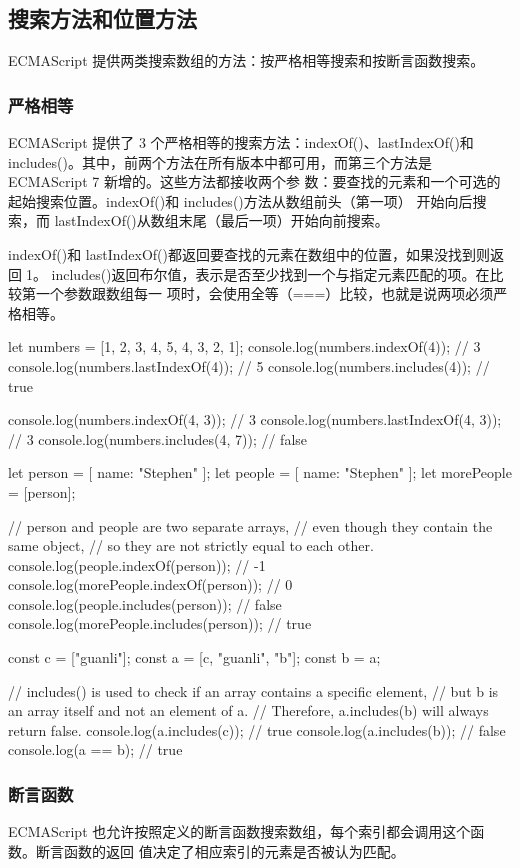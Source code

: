 \subsection{搜索方法和位置方法}
ECMAScript 提供两类搜索数组的方法：按严格相等搜索和按断言函数搜索。
\subsubsection{严格相等}
ECMAScript 提供了 3 个严格相等的搜索方法：indexOf()、lastIndexOf()和 includes()。其中，前两个方法在所有版本中都可用，而第三个方法是 ECMAScript 7 新增的。这些方法都接收两个参
数：要查找的元素和一个可选的起始搜索位置。indexOf()和 includes()方法从数组前头（第一项）
开始向后搜索，而 lastIndexOf()从数组末尾（最后一项）开始向前搜索。

indexOf()和 lastIndexOf()都返回要查找的元素在数组中的位置，如果没找到则返回1。
includes()返回布尔值，表示是否至少找到一个与指定元素匹配的项。在比较第一个参数跟数组每一
项时，会使用全等（===）比较，也就是说两项必须严格相等。

\begin{js}
let numbers = [1, 2, 3, 4, 5, 4, 3, 2, 1];
console.log(numbers.indexOf(4)); // 3
console.log(numbers.lastIndexOf(4)); // 5
console.log(numbers.includes(4)); // true

console.log(numbers.indexOf(4, 3)); // 3
console.log(numbers.lastIndexOf(4, 3)); // 3
console.log(numbers.includes(4, 7)); // false

let person = [{ name: "Stephen" }];
let people = [{ name: "Stephen" }];
let morePeople = [person];

// person and people are two separate arrays,
// even though they contain the same object,
// so they are not strictly equal to each other.
console.log(people.indexOf(person)); // -1
console.log(morePeople.indexOf(person)); // 0
console.log(people.includes(person)); // false
console.log(morePeople.includes(person)); // true
\end{js}

\begin{js}
const c = ["guanli"];
const a = [c, "guanli", "b"];
const b = a;

// includes() is used to check if an array contains a specific element,
// but b is an array itself and not an element of a.
// Therefore, a.includes(b) will always return false.
console.log(a.includes(c)); // true
console.log(a.includes(b)); // false
console.log(a == b); // true
\end{js}
\subsubsection{断言函数}
ECMAScript 也允许按照定义的断言函数搜索数组，每个索引都会调用这个函数。断言函数的返回
值决定了相应索引的元素是否被认为匹配。

